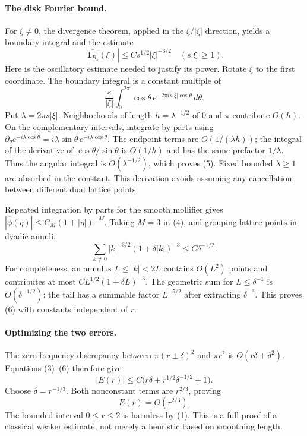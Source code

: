 \documentclass[11pt]{article}
\begin{document}
\paragraph{The disk Fourier bound.}
For $\xi\ne0$, the divergence theorem, applied in the $\xi/|\xi|$
direction, yields a boundary integral and the estimate
\[
 \left|\widehat{{\boldsymbol1}_{B_s}}(\xi)\right|
           \le C s^{1/2}|\xi|^{-3/2}
              \quad(s|\xi|\ge1).                        \tag{5}
\]
Here is the oscillatory estimate needed to justify its power. Rotate
$\xi$ to the first coordinate. The boundary integral is a constant
multiple of
\[
 \frac{s}{|\xi|}\int_0^{2\pi}
          \cos\theta\,e^{-2\pi i s|\xi|\cos\theta}\,d\theta.
\]
Put $\lambda=2\pi s|\xi|$. Neighborhoods of length
$h=\lambda^{-1/2}$ of $0$ and $\pi$ contribute $O(h)$.
On the complementary intervals, integrate by parts using
$\partial_\theta e^{-i\lambda\cos\theta}
 =i\lambda\sin\theta\,e^{-i\lambda\cos\theta}$.
The endpoint terms are $O(1/(\lambda h))$; the integral of the derivative
of $\cos\theta/\sin\theta$ is $O(1/h)$ and has the same prefactor
$1/\lambda$. Thus the angular integral is $O(\lambda^{-1/2})$,
which proves (5). Fixed bounded $\lambda\ge1$ are absorbed in the
constant. This derivation avoids assuming any cancellation between
different dual lattice points.

Repeated integration by parts for the smooth mollifier gives
$|\widehat\phi(\eta)|\le C_M(1+|\eta|)^{-M}$.
Taking $M=3$ in (4), and grouping lattice points in dyadic annuli,
\[
 \sum_{k\ne0}|k|^{-3/2}(1+\delta|k|)^{-3}
       \le C\delta^{-1/2}.                              \tag{6}
\]
For completeness, an annulus $L\le|k|<2L$ contains $O(L^2)$ points
and contributes at most $CL^{1/2}(1+\delta L)^{-3}$.
The geometric sum for $L\le\delta^{-1}$ is $O(\delta^{-1/2})$;
the tail has a summable factor $L^{-5/2}$ after extracting
$\delta^{-3}$. This proves (6) with constants independent of $r$.

\paragraph{Optimizing the two errors.}
The zero-frequency discrepancy between $\pi(r\pm\delta)^2$ and
$\pi r^2$ is $O(r\delta+\delta^2)$. Equations (3)--(6) therefore give
\[
       |E(r)|\le C\bigl(r\delta+r^{1/2}\delta^{-1/2}+1\bigr).
                                                               \tag{7}
\]
Choose $\delta=r^{-1/3}$. Both nonconstant terms are $r^{2/3}$, proving
\[
                              E(r)=O(r^{2/3}).           \tag{8}
\]
The bounded interval $0\le r\le2$ is harmless by (1).
This is a full proof of a classical weaker estimate, not merely a
heuristic based on smoothing length.
\end{document}

